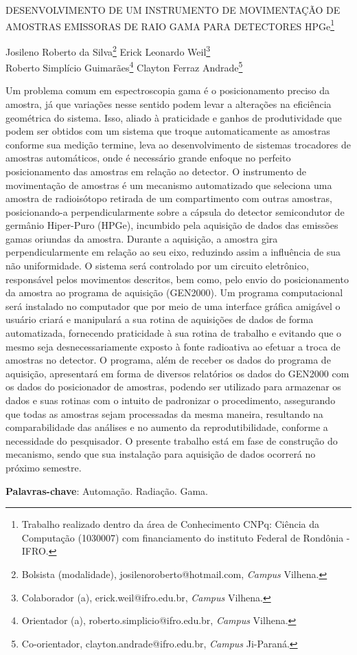 \documentclass[article,12pt,onesidea,4paper,english,brazil]{abntex2}
\begin{document}
	
	
	\frenchspacing 
	
	\begin{center}
		\LARGE DESENVOLVIMENTO DE UM INSTRUMENTO DE MOVIMENTAÇÃO DE
		AMOSTRAS EMISSORAS DE RAIO GAMA PARA DETECTORES HPGe\footnote{Trabalho realizado dentro da área de Conhecimento CNPq: Ciência da Computação (1030007) com
		financiamento do instituto Federal de Rondônia - IFRO.}
		
		\normalsize
		Josileno Roberto da Silva\footnote{Bolsista (modalidade), josilenoroberto@hotmail.com, \textit{Campus} Vilhena.} 
		Erick Leonardo Weil\footnote{Colaborador (a), erick.weil@ifro.edu.br, \textit{Campus} Vilhena.} \\
		Roberto Simplício Guimarães\footnote{Orientador (a), roberto.simplicio@ifro.edu.br, \textit{Campus} Vilhena.} 
		Clayton Ferraz Andrade\footnote{Co-orientador, clayton.andrade@ifro.edu.br, \textit{Campus} Ji-Paraná.} 
	\end{center}
	
	\noindent Um problema comum em espectroscopia gama é o posicionamento preciso da
	amostra, já que variações nesse sentido podem levar a alterações na eficiência
	geométrica do sistema. Isso, aliado à praticidade e ganhos de produtividade que
	podem ser obtidos com um sistema que troque automaticamente as amostras
	conforme sua medição termine, leva ao desenvolvimento de sistemas trocadores de
	amostras automáticos, onde é necessário grande enfoque no perfeito
	posicionamento das amostras em relação ao detector. O instrumento de
	movimentação de amostras é um mecanismo automatizado que seleciona uma
	amostra de radioisótopo retirada de um compartimento com outras amostras,
	posicionando-a perpendicularmente sobre a cápsula do detector semicondutor de
	germânio Hiper-Puro (HPGe), incumbido pela aquisição de dados das emissões
	gamas oriundas da amostra. Durante a aquisição, a amostra gira
	perpendicularmente em relação ao seu eixo, reduzindo assim a influência de sua
	não uniformidade. O sistema será controlado por um circuito eletrônico, responsável
	pelos movimentos descritos, bem como, pelo envio do posicionamento da amostra
	ao programa de aquisição (GEN2000). Um programa computacional será instalado
	no computador que por meio de uma interface gráfica amigável o usuário criará e
	manipulará a sua rotina de aquisições de dados de forma automatizada, fornecendo
	praticidade à sua rotina de trabalho e evitando que o mesmo seja
	desnecessariamente exposto à fonte radioativa ao efetuar a troca de amostras no
	detector. O programa, além de receber os dados do programa de aquisição,
	apresentará em forma de diversos relatórios os dados do GEN2000 com os dados
	do posicionador de amostras, podendo ser utilizado para armazenar os dados e
	suas rotinas com o intuito de padronizar o procedimento, assegurando que todas as
	amostras sejam processadas da mesma maneira, resultando na comparabilidade
	das análises e no aumento da reprodutibilidade, conforme a necessidade do
	pesquisador. O presente trabalho está em fase de construção do mecanismo, sendo
	que sua instalação para aquisição de dados ocorrerá no próximo semestre.
	
	\vspace{\onelineskip}
	
	\noindent
	\textbf{Palavras-chave}: Automação. Radiação. Gama.
	
\end{document}
